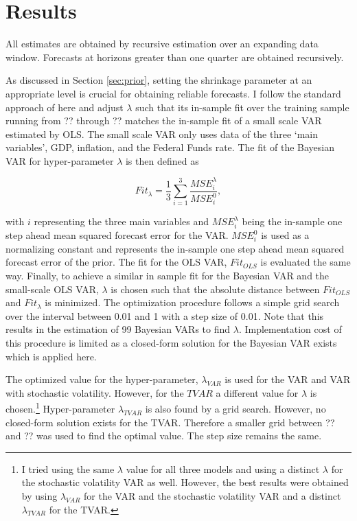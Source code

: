 \documentclass[12pt,letterpaper,fleqn]{article}           %
\begin{document}
\section{Results}
\label{sec:results}

All estimates are obtained by recursive estimation over an expanding data window. Forecasts at horizons greater than one quarter are obtained recursively.

As discussed in Section \ref{sec:prior}, setting the shrinkage parameter at an appropriate level is crucial for obtaining reliable forecasts. I follow the standard approach of \textcite{banbura10} here and adjust $\lambda$ such that its in-sample fit over the training sample running from ?? through ?? matches the in-sample fit of a small scale VAR estimated by OLS. The small scale VAR only uses data of the three `main variables', GDP, inflation, and the Federal Funds rate. The fit of the Bayesian VAR for hyper-parameter $\lambda$ is then defined as

\begin{equation}
Fit_{\lambda} = \frac{1}{3}\sum_{i=1}^3 \frac{MSE_i^\lambda}{MSE_i^0},
\end{equation}

with $i$ representing the three main variables and $MSE_i^\lambda$ being the in-sample one step ahead mean squared forecast error for the VAR. $MSE_i^0$ is used as a normalizing constant and represents the in-sample one step ahead mean squared forecast error of the prior. The fit for the OLS VAR, $Fit_{OLS}$ is evaluated the same way. Finally, to achieve a similar in sample fit for the Bayesian VAR and the small-scale OLS VAR, $\lambda$ is chosen such that the absolute distance between $Fit_{OLS}$ and $Fit_{\lambda}$ is minimized. The optimization procedure follows a simple grid search over the interval between 0.01 and 1 with a step size of 0.01. Note that this results in the estimation of 99 Bayesian VARs to find $\lambda$. Implementation cost of this procedure is limited as a closed-form solution for the Bayesian VAR exists which is applied here.

The optimized value for the hyper-parameter, $\lambda_{VAR}$ is used for the VAR and VAR with stochastic volatility. However, for the $TVAR$ a different value for $\lambda$ is chosen.\footnote{I tried using the same $\lambda$ value for all three models and using a distinct $\lambda$ for the stochastic volatility VAR as well. However, the best results were obtained by using $\lambda_{VAR}$ for the VAR and the stochastic volatility VAR and a distinct $\lambda_{TVAR}$ for the TVAR.} Hyper-parameter $\lambda_{TVAR}$ is also found by a grid search. However, no closed-form solution exists for the TVAR. Therefore a smaller grid between ?? and ?? was used to find the optimal value. The step size remains the same.
\end{document}
